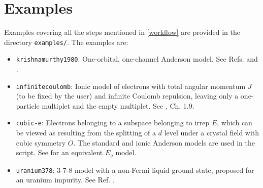 \documentclass[notitlepage]{article}
\begin{document}
\section{Examples}
\label{examples}
Examples covering all the steps mentioned in \ref{workflow}
are provided in the directory \texttt{examples/}. The
examples are:
\begin{itemize}
    \item \texttt{krishnamurthy1980}: One-orbital,
        one-channel Anderson model. See Refs.
        \cite{krishna-murthy1980a} and
        \cite{krishna-murthy1980b}.
    \item \texttt{infinitecoulomb}: Ionic model of electrons
        with total angular momentum $J$ (to be fixed by the
        user) and infinite Coulomb repulsion, leaving only a
        one-particle multiplet and the empty multiplet. See
        \cite{hewson1997}, Ch. 1.9.
    \item \texttt{cubic-e}: Electrons belonging to a
        subspace belonging to irrep $E$, which can be viewed as
        resulting from the splitting of a $d$ level under a
        crystal field with cubic symmetry $O$. The standard
        and ionic Anderson models are used in the script. 
        See \cite{calvo-fernandez2024} for an equivalent
        $E_g$ model.
    \item \texttt{uranium378}: 3-7-8 model with a non-Fermi
        liquid ground state, proposed for an uranium
        impurity. See Ref. \cite{cox1987}.
\end{itemize}
\end{document}
